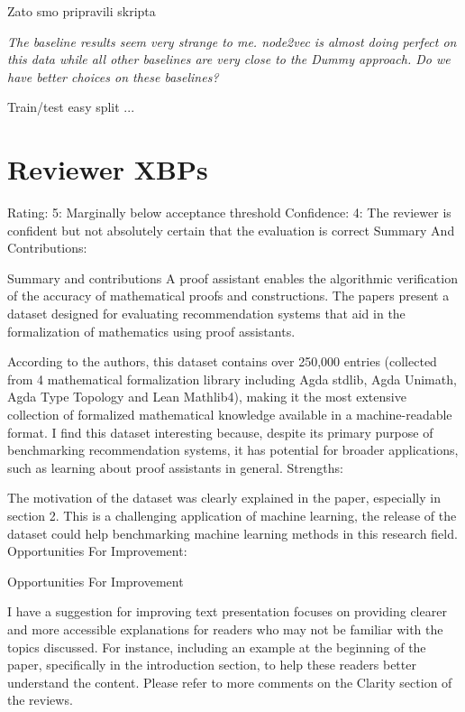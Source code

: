 \documentclass{article}
\begin{document}
Zato smo pripravili skripta

\textit{The baseline results seem very strange to me. node2vec is almost doing perfect on this data while all other baselines are very close to the Dummy approach. Do we have better choices on these baselines?
}

Train/test easy split ...



\section{Reviewer XBPs}

Rating: 5: Marginally below acceptance threshold
Confidence: 4: The reviewer is confident but not absolutely certain that the evaluation is correct
Summary And Contributions:

Summary and contributions A proof assistant enables the algorithmic verification of the accuracy of mathematical proofs and constructions. The papers present a dataset designed for evaluating recommendation systems that aid in the formalization of mathematics using proof assistants.

According to the authors, this dataset contains over 250,000 entries (collected from 4 mathematical formalization library including Agda stdlib, Agda Unimath, Agda Type Topology and Lean Mathlib4), making it the most extensive collection of formalized mathematical knowledge available in a machine-readable format. I find this dataset interesting because, despite its primary purpose of benchmarking recommendation systems, it has potential for broader applications, such as learning about proof assistants in general.
Strengths:

The motivation of the dataset was clearly explained in the paper, especially in section 2. This is a challenging application of machine learning, the release of the dataset could help benchmarking machine learning methods in this research field.
Opportunities For Improvement:

Opportunities For Improvement

I have a suggestion for improving text presentation focuses on providing clearer and more accessible explanations for readers who may not be familiar with the topics discussed. For instance, including an example at the beginning of the paper, specifically in the introduction section, to help these readers better understand the content. Please refer to more comments on the Clarity section of the reviews.
\end{document}
